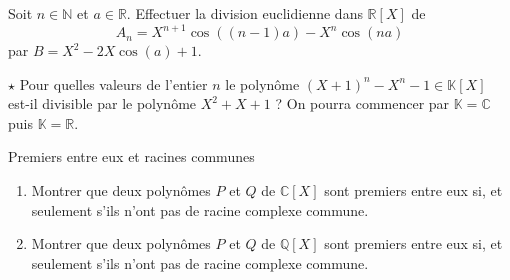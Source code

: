 \documentclass[french,a4paper]{article}
\newcommand{\N}{\mathbb{N}}
\newcommand{\Q}{\mathbb{Q}}
\newcommand{\R}{\mathbb{R}}
\newcommand{\C}{\mathbb{C}}
\newcommand{\K}{\mathbb{K}}
\theoremstyle{plain}
\theoremstyle{definition}
\theoremstyle{remark}
\begin{document}
\begin{ex}[Moulin.AG.62]{}
	Soit $n\in\N$ et $a\in\R$. Effectuer la division euclidienne dans $\R[X]$ de $$A_n=X^{n+1}\cos((n-1)a)-X^n\cos(na)$$ par $B=X^2-2X\cos(a)+1$.
\end{ex}

\begin{ex}[Moulin.AG.63]{$\star$}
	Pour quelles valeurs de l'entier $n$ le polynôme $(X+1)^n-X^n-1\in\K[X]$ est-il divisible par le polynôme $X^2+X+1$ ? On pourra commencer par $\K=\C$ puis $\K=\R$.
\end{ex}

\begin{ex}[Moulin.AG.64]{Premiers entre eux et racines communes}
	\begin{enumerate}
		\item Montrer que deux polynômes $P$ et $Q$ de $\C[X]$ sont premiers entre eux si, et seulement s'ils n'ont pas de racine complexe commune.
		\item Montrer que deux polynômes $P$ et $Q$ de $\Q[X]$ sont premiers entre eux si, et seulement s'ils n'ont pas de racine complexe commune.
	\end{enumerate}
\end{ex}
\end{document}
